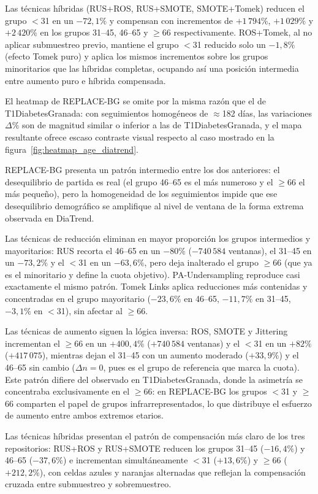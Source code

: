 Las técnicas híbridas (RUS+ROS, RUS+SMOTE, SMOTE+Tomek) reducen el grupo
$<$31 en un $-72{,}1\%$ y compensan con incrementos de $+1\,794\%$,
$+1\,029\%$ y $+2\,420\%$ en los grupos 31--45, 46--65 y $\geq$66
respectivamente. ROS+Tomek, al no aplicar submuestreo previo, mantiene
el grupo $<$31 reducido solo un $-1{,}8\%$ (efecto Tomek puro) y aplica
los mismos incrementos sobre los grupos minoritarios que las híbridas
completas, ocupando así una posición intermedia entre aumento puro e
híbrida compensada.

El heatmap de REPLACE-BG se omite por la misma razón que el de T1DiabetesGranada: con seguimientos homogéneos de $\approx$182 días, las variaciones 
$\Delta\%$ son de magnitud similar o inferior a las de T1DiabetesGranada, y el mapa resultante ofrece escaso contraste visual respecto al caso mostrado en la figura~\ref{fig:heatmap_age_diatrend}.

REPLACE-BG presenta un patrón intermedio entre los dos anteriores: el
desequilibrio de partida es real (el grupo 46--65 es el más numeroso y el
$\geq$66 el más pequeño), pero la homogeneidad de los seguimientos impide
que ese desequilibrio demográfico se amplifique al nivel de ventana de la
forma extrema observada en DiaTrend.

Las técnicas de reducción eliminan en mayor proporción los grupos intermedios
y mayoritarios: RUS recorta el 46--65 en un $-80\%$ ($-740\,584$ ventanas),
el 31--45 en un $-73{,}2\%$ y el $<$31 en un $-63{,}6\%$, pero deja
inalterado el grupo $\geq$66 (que ya es el minoritario y define la cuota
objetivo). PA-Undersampling reproduce casi exactamente el mismo patrón.
Tomek Links aplica reducciones más contenidas y concentradas en el grupo
mayoritario ($-23{,}6\%$ en 46--65, $-11{,}7\%$ en 31--45, $-3{,}1\%$
en $<$31), sin afectar al $\geq$66.

Las técnicas de aumento siguen la lógica inversa: ROS, SMOTE y Jittering
incrementan el $\geq$66 en un $+400{,}4\%$ ($+740\,584$ ventanas) y el
$<$31 en un $+82\%$ ($+417\,075$), mientras dejan el 31--45 con un aumento
moderado ($+33{,}9\%$) y el 46--65 sin cambio ($\Delta n = 0$, pues es el
grupo de referencia que marca la cuota). Este patrón difiere del observado
en T1DiabetesGranada, donde la asimetría se concentraba exclusivamente en
el $\geq$66: en REPLACE-BG los grupos $<$31 y $\geq$66 comparten el papel
de grupos infrarrepresentados, lo que distribuye el esfuerzo de aumento
entre ambos extremos etarios.

Las técnicas híbridas presentan el patrón de compensación más claro de los
tres repositorios: RUS+ROS y RUS+SMOTE reducen los grupos 31--45 ($-16{,}4\%$)
y 46--65 ($-37{,}6\%$) e incrementan simultáneamente $<$31 ($+13{,}6\%$) y
$\geq$66 ($+212{,}2\%$), con celdas azules y naranjas alternadas que reflejan
la compensación cruzada entre submuestreo y sobremuestreo.

